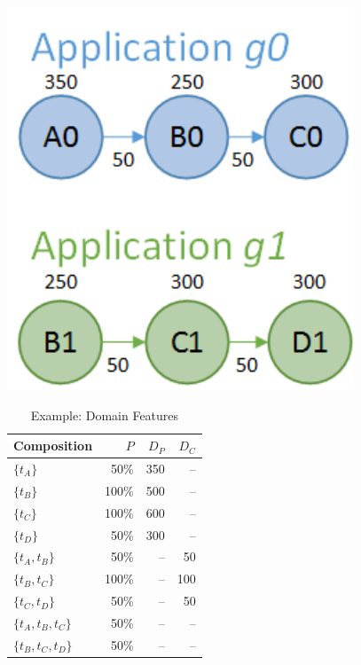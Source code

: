 \begin{table}[h]
  \begin{minipage}[b]{0.35\linewidth}
    \centering
    \includegraphics[width=0.9\linewidth]{fig/Apps.pdf}
    \label{fig:Apps}
  \end{minipage}
	 \hfill
  \begin{varwidth}[b]{0.6\linewidth}
    \centering
    \begin{tabular}{l r r r}
      \toprule
      Composition & $P$ & $D_{P}$ & $D_{C}$ \\
      \midrule
      $\{t_A\}$ & 50\% & 350 & -- \\
      $\{t_B\}$ & 100\% & 500 & -- \\
      $\{t_C\}$ & 100\% & 600 & -- \\
      $\{t_D\}$ & 50\% & 300 & -- \\
			\hline
			$\{t_A,t_B\}$ & 50\% & -- & 50 \\
			$\{t_B,t_C\}$ & 100\% & -- & 100 \\
			$\{t_C,t_D\}$ & 50\% & -- & 50 \\
			\hline
			$\{t_A,t_B,t_C\}$ & 50\% & -- & -- \\
			$\{t_B,t_C,t_D\}$ & 50\% & -- & -- \\			
      \bottomrule
    \end{tabular}
    \caption{Example: Domain Features}
    \label{tab:egFeature}
  \end{varwidth}
\end{table}